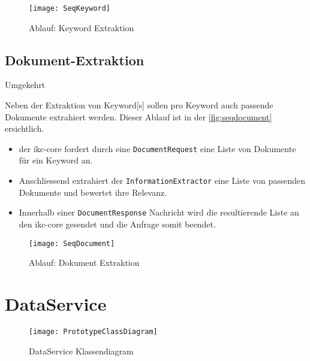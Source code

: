     \begin{figure}[H]
    \centering
    \texttt{[image: SeqKeyword]}
    \caption{Ablauf: \gls{Keyword} Extraktion}
    \label{fig:seqkeywordextraction}
    \end{figure}

\subsection{Dokument-Extraktion}

Umgekehrt

Neben der Extraktion von \gls{Keyword}[s] sollen pro \gls{Keyword} auch passende Dokumente extrahiert werden. Dieser Ablauf ist in der \autoref{fig:seqdocument} ersichtlich.
\begin{itemize}
    \item der \gls{ikc-core} fordert durch eine \texttt{DocumentRequest} eine Liste von Dokumente für ein \gls{Keyword} an. 
    \item Anschliessend extrahiert der \texttt{InformationExtractor} eine Liste von passenden Dokumente und bewertet ihre Relevanz. 
    \item Innerhalb einer \texttt{DocumentResponse} Nachricht wird die resultierende Liste an den \gls{ikc-core} gesendet und die Anfrage somit beendet.
\end{itemize}

    \begin{figure}[H]
    \centering
    \texttt{[image: SeqDocument]}
    \caption{Ablauf: Dokument Extraktion}
    \label{fig:seqdocument}
    \end{figure}


\section{DataService}

    \begin{figure}[H]
    \centering
    \texttt{[image: PrototypeClassDiagram]}
    \caption{DataService Klassendiagram}
    \label{fig:dataserviceClassDiagram}
    \end{figure}


